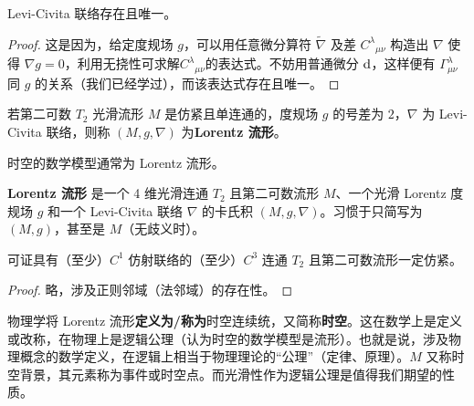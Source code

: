 \begin{theorem}
    Levi-Civita 联络存在且唯一。
\end{theorem}
\begin{proof}
    这是因为，给定度规场 $g$，可以用任意微分算符 $\tilde\nabla$ 及差 $C^\lambda{}_{\mu\nu}$ 构造出 $\nabla$ 使得 $\nabla g=0$，利用无挠性可求解$C^\lambda{}_{\mu\nu}$的表达式。不妨用普通微分 $\dd$，这样便有 $\Gamma^\lambda_{\mu\nu}$ 同 $g$ 的关系（我们已经学过），而该表达式存在且唯一。
\end{proof}

\begin{definition}
    若第二可数 $T_2$ 光滑流形 $M$ 是仿紧且单连通的，度规场 $g$ 的号差为 $2$，$\nabla$ 为 Levi-Civita 联络，则称 $(M,g,\nabla)$ 为\textbf{Lorentz 流形}。
\end{definition}

\begin{remark}
    时空的数学模型通常为 Lorentz 流形。
\end{remark}

\begin{definition}
    \textbf{Lorentz 流形} 是一个 4 维光滑连通 $T_2$ 且第二可数流形 $M$、一个光滑 Lorentz 度规场 $g$ 和一个 Levi-Civita 联络 $\nabla$ 的卡氏积 $(M,g,\nabla)$。习惯于只简写为 $(M,g)$，甚至是 $M$（无歧义时）。
\end{definition}

\begin{theorem}
    可证具有（至少）$C^1$ 仿射联络的（至少）$C^3$ 连通 $T_2$ 且第二可数流形一定仿紧。
\end{theorem}
\begin{proof}
    略，涉及正则邻域（法邻域）的存在性。
\end{proof}

物理学将 Lorentz 流形\textbf{定义为/称为}时空连续统，又简称\textbf{时空}。这在数学上是定义或改称，在物理上是逻辑公理（认为时空的数学模型是流形）。也就是说，涉及物理概念的数学定义，在逻辑上相当于物理理论的“公理”（定律、原理）。$M$ 又称时空背景，其元素称为事件或时空点。而光滑性作为逻辑公理是值得我们期望的性质。




